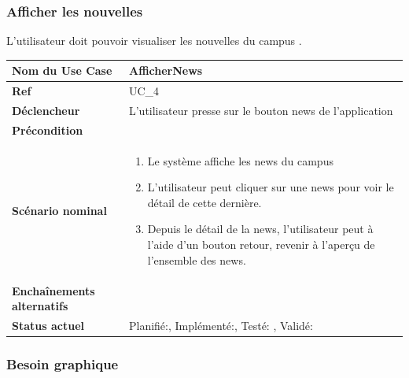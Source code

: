 	\subsubsection{Afficher les nouvelles}
					L'utilisateur doit pouvoir visualiser les nouvelles du campus .\\[0.2cm]
					\begin{longtable}{|l|p{10cm}|}
						\hline \textbf{Nom du Use Case} & AfficherNews \\ 
						\hline \textbf{Ref} & UC\_4  \\ 
						\hline \textbf{Déclencheur} & L'utilisateur presse sur le bouton news  de l'application \\
						\hline \textbf{Précondition} &  \\
						\hline \textbf{Scénario nominal} & 
						\begin{enumerate}
							\item Le système affiche les news du campus
							\item L'utilisateur peut cliquer sur une news pour voir le détail de cette dernière.
							\item Depuis le détail de la news, l'utilisateur peut à l'aide d'un bouton retour, revenir à l'aperçu de l'ensemble des news.
						\end{enumerate}
						\\ 
						\hline \textbf{Enchaînements alternatifs} & \\
						\hline \textbf{Status actuel} & Planifié:\CheckedBox , Implémenté:\CheckedBox  , Testé: \CheckedBox  , Validé: \CheckedBox  \\
						\hline 
					\end{longtable} 
			\subsubsection*{Besoin graphique}




